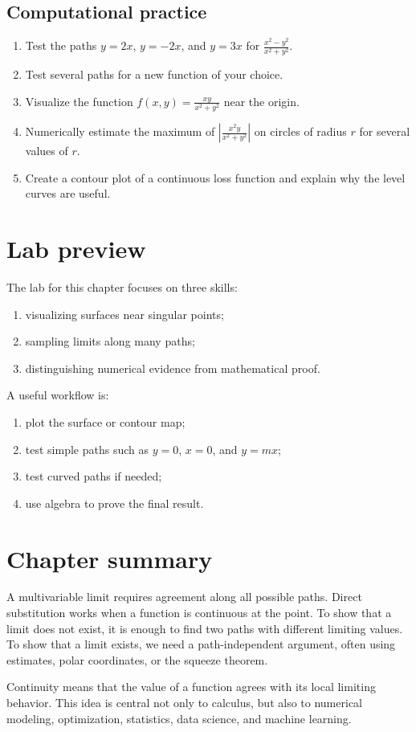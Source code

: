 \documentclass[11pt]{article}
\begin{document}
\subsection*{Computational practice}
\begin{enumerate}[resume]
  \item Test the paths $y=2x$, $y=-2x$, and $y=3x$ for $\frac{x^2-y^2}{x^2+y^2}$.
  \item Test several paths for a new function of your choice.
  \item Visualize the function $f(x,y)=\frac{xy}{x^2+y^2}$ near the origin.
  \item Numerically estimate the maximum of $\left|\frac{x^2y}{x^2+y^2}\right|$ on circles of radius $r$ for several values of $r$.
  \item Create a contour plot of a continuous loss function and explain why the level curves are useful.
\end{enumerate}

\section{Lab preview}

The lab for this chapter focuses on three skills:
\begin{enumerate}
  \item visualizing surfaces near singular points;
  \item sampling limits along many paths;
  \item distinguishing numerical evidence from mathematical proof.
\end{enumerate}
A useful workflow is:
\begin{enumerate}
  \item plot the surface or contour map;
  \item test simple paths such as $y=0$, $x=0$, and $y=mx$;
  \item test curved paths if needed;
  \item use algebra to prove the final result.
\end{enumerate}

\section*{Chapter summary}

A multivariable limit requires agreement along all possible paths. Direct substitution works when a function is continuous at the point. To show that a limit does not exist, it is enough to find two paths with different limiting values. To show that a limit exists, we need a path-independent argument, often using estimates, polar coordinates, or the squeeze theorem.

Continuity means that the value of a function agrees with its local limiting behavior. This idea is central not only to calculus, but also to numerical modeling, optimization, statistics, data science, and machine learning.
\end{document}
